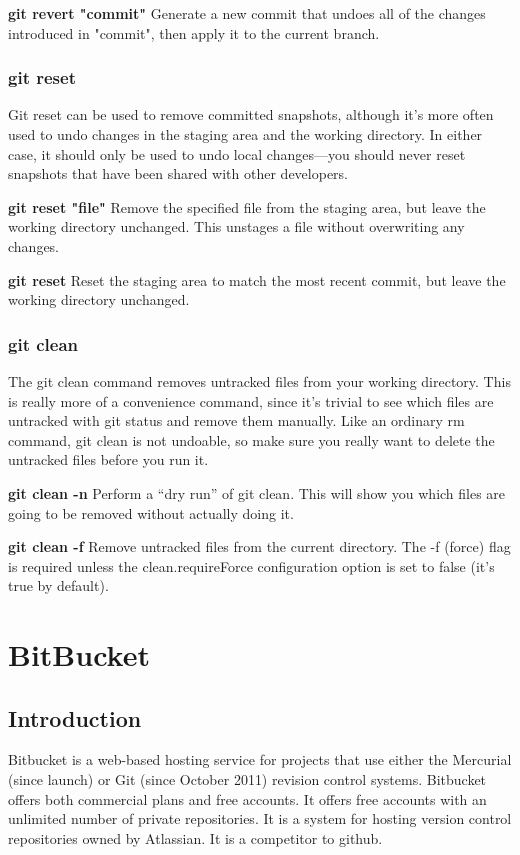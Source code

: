 \documentclass{article}
\begin{document}
        \textbf{git revert "commit"}
        Generate a new commit that undoes all of the changes introduced in "commit", then apply it to the current branch.

    \subsubsection{git reset}
        Git reset can be used to remove committed snapshots, although it’s more often used to undo changes in the staging area and the working directory. In either case, it should only be used to undo local changes—you should never reset snapshots that have been shared with other developers.

        \textbf{git reset "file"}
        Remove the specified file from the staging area, but leave the working directory unchanged. This unstages a file without overwriting any changes.

        \textbf{git reset}
        Reset the staging area to match the most recent commit, but leave the working directory unchanged. 

    \subsubsection{git clean}
        The git clean command removes untracked files from your working directory. This is really more of a convenience command, since it’s trivial to see which files are untracked with git status and remove them manually. Like an ordinary rm command, git clean is not undoable, so make sure you really want to delete the untracked files before you run it.

        \textbf{git clean -n}
        Perform a “dry run” of git clean. This will show you which files are going to be removed without actually doing it.

        \textbf{git clean -f}
        Remove untracked files from the current directory. The -f (force) flag is required unless the clean.requireForce configuration option is set to false (it's true by default). 


\section{BitBucket}
\subsection{Introduction}
    Bitbucket is a web-based hosting service for projects that use either the Mercurial (since launch) or Git (since October 2011) revision control systems. Bitbucket offers both commercial plans and free accounts. It offers free accounts with an unlimited number of private repositories. It is a system for hosting version control repositories owned by Atlassian. It is a competitor to github.
\end{document}
